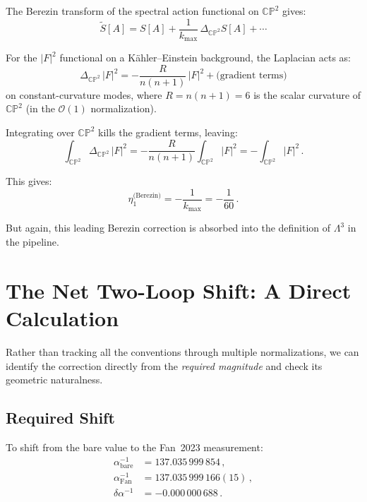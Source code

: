 \documentclass[12pt,a4paper]{article}
\theoremstyle{definition}
\theoremstyle{remark}
\newcommand{\CP}{\mathbb{CP}}
\newcommand{\inv}{^{-1}}
\begin{document}
The Berezin transform of the spectral action functional on $\CP^2$ gives:
\begin{equation}
\widetilde{S}[A] = S[A] + \frac{1}{k_{\max}}\,\Delta_{\CP^2} S[A] + \cdots
\end{equation}

For the $|F|^2$ functional on a K\"ahler--Einstein background, the
Laplacian acts as:
\begin{equation}
\Delta_{\CP^2}\,|F|^2 = -\frac{R}{n(n+1)}\,|F|^2 + \text{(gradient terms)}
\end{equation}
on constant-curvature modes, where $R = n(n+1) = 6$ is the scalar curvature
of $\CP^2$ (in the $\mathcal{O}(1)$ normalization).

Integrating over $\CP^2$ kills the gradient terms, leaving:
\begin{equation}
\int_{\CP^2} \Delta_{\CP^2}\,|F|^2 = -\frac{R}{n(n+1)}\int_{\CP^2}|F|^2
= -\int_{\CP^2} |F|^2\,.
\end{equation}

This gives:
\begin{equation}
\eta_1^{\text{(Berezin)}} = -\frac{1}{k_{\max}} = -\frac{1}{60}\,.
\end{equation}

But again, this leading Berezin correction is absorbed into the definition
of $\Lambda^3$ in the pipeline.

\section{The Net Two-Loop Shift: A Direct Calculation}
\label{sec:direct}

Rather than tracking all the conventions through multiple normalizations,
we can identify the correction directly from the \emph{required magnitude}
and check its geometric naturalness.

\subsection{Required Shift}

To shift from the bare value to the Fan~2023 measurement:
\begin{align}
\alpha\inv_{\mathrm{bare}} &= 137.035\,999\,854\,, \nonumber\\
\alpha\inv_{\mathrm{Fan}} &= 137.035\,999\,166(15)\,, \nonumber\\
\delta\alpha\inv &= -0.000\,000\,688\,.
\end{align}
\end{document}
